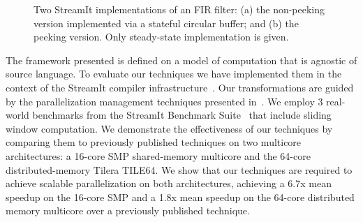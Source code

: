 \begin{figure}[t]
\caption[Two implementations of an FIR filter.]{\label{fig:fir-code}
  Two StreamIt implementations of an FIR filter:
   (a) the non-peeking version implemented via a
  stateful circular buffer; and (b) the peeking version. Only steady-state implementation is
  given.}
\end{figure}

The framework presented is defined on a model of computation that is
agnostic of source language.  To evaluate our techniques we have
implemented them in the context of the StreamIt compiler
infrastructure~\cite{gordon-asplos06}.  Our transformations are guided
by the parallelization management techniques presented
in~\cite{gordon-asplos06}.  We employ 3 real-world benchmarks from the
StreamIt Benchmark Suite~\cite{streamit-suite} that include sliding
window computation.  We demonstrate the effectiveness of our
techniques by comparing them to previously published techniques on two
multicore architectures: a 16-core SMP shared-memory multicore and the
64-core distributed-memory Tilera TILE64.  We show that
our techniques are required to achieve scalable parallelization on
both architectures, achieving a 6.7x mean speedup on the 16-core SMP
and a 1.8x mean speedup on the 64-core distributed memory multicore
over a previously published technique.

